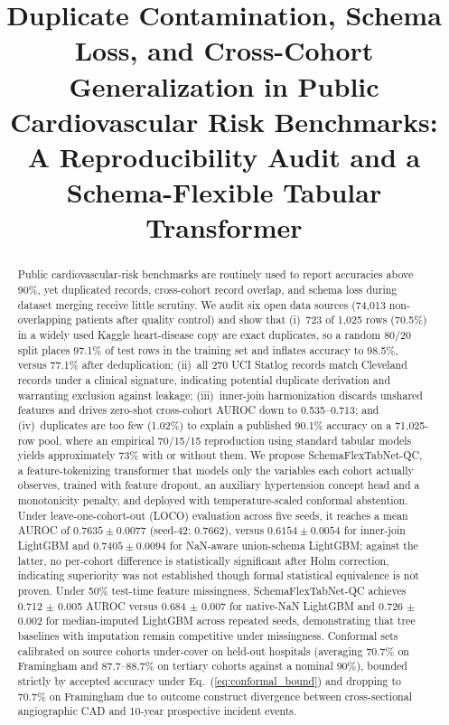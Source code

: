 \documentclass[journal]{IEEEtran}
\newcommand{\sfn}{SchemaFlexTabNet-QC}
\begin{document}
\title{Duplicate Contamination, Schema Loss, and Cross-Cohort Generalization in Public Cardiovascular Risk Benchmarks: A Reproducibility Audit and a Schema-Flexible Tabular Transformer}

\author{
}

\maketitle

\begin{abstract}
Public cardiovascular-risk benchmarks are routinely used to report accuracies above 90\%, yet duplicated records, cross-cohort record overlap, and schema loss during dataset merging receive little scrutiny. We audit six open data sources (74{,}013 non-overlapping patients after quality control) and show that (i)~723 of 1{,}025 rows (70.5\%) in a widely used Kaggle heart-disease copy are exact duplicates, so a random 80/20 split places 97.1\% of test rows in the training set and inflates accuracy to 98.5\%, versus 77.1\% after deduplication; (ii)~all 270 UCI Statlog records match Cleveland records under a clinical signature, indicating potential duplicate derivation and warranting exclusion against leakage; (iii)~inner-join harmonization discards unshared features and drives zero-shot cross-cohort AUROC down to 0.535--0.713; and (iv)~duplicates are too few (1.02\%) to explain a published 90.1\% accuracy on a 71{,}025-row pool, where an empirical 70/15/15 reproduction using standard tabular models yields approximately 73\% with or without them. We propose \sfn{}, a feature-tokenizing transformer that models only the variables each cohort actually observes, trained with feature dropout, an auxiliary hypertension concept head and a monotonicity penalty, and deployed with temperature-scaled conformal abstention. Under leave-one-cohort-out (LOCO) evaluation across five seeds, it reaches a mean AUROC of $0.7635 \pm 0.0077$ (seed-42: 0.7662), versus $0.6154 \pm 0.0054$ for inner-join LightGBM and $0.7405 \pm 0.0094$ for NaN-aware union-schema LightGBM; against the latter, no per-cohort difference is statistically significant after Holm correction, indicating superiority was not established though formal statistical equivalence is not proven. Under 50\% test-time feature missingness, \sfn{} achieves 0.712 $\pm$ 0.005 AUROC versus 0.684 $\pm$ 0.007 for native-NaN LightGBM and 0.726 $\pm$ 0.002 for median-imputed LightGBM across repeated seeds, demonstrating that tree baselines with imputation remain competitive under missingness. Conformal sets calibrated on source cohorts under-cover on held-out hospitals (averaging 70.7\% on Framingham and 87.7--88.7\% on tertiary cohorts against a nominal 90\%), bounded strictly by accepted accuracy under Eq.~(\ref{eq:conformal_bound}) and dropping to 70.7\% on Framingham due to outcome construct divergence between cross-sectional angiographic CAD and 10-year prospective incident events.
\end{abstract}
\end{document}
